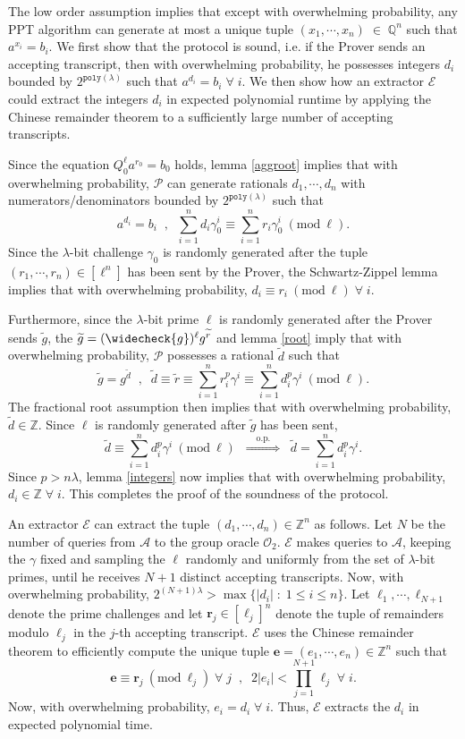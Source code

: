 \documentclass[11pt, lettersize, notitlepage, leqno, footskip=0.6cm]{article}
\newcommand{\bz}{\mathbb Z}
\newcommand{\bq}{\mathbb Q}
\newcommand{\pl}{\prod\limits}
\newcommand{\slim}{\sum\limits}
\newcommand{\ttt}{\texttt}
\newcommand{\impop}{\overset{\;\;\;\;\mr{o.p.}\;\;\;\;}{\Longrightarrow}}
\newcommand{\wti}{\widetilde}
\newcommand{\mc}{\mathcal}
\newcommand{\mbf}{\mathbf}
\newcommand{\mr}{\mathrm}
\newcommand{\lam}{\lambda}
\newcommand{\weck}{\widecheck}
\newcommand{\mP}{\mc{P}}
\newcommand{\A}{\mc{A}}
\newcommand{\vs}{\vspace{-0.15cm}}
\newcommand{\op}{overwhelming probability}
\newcommand{\Mod}[1]{\ (\mathrm{mod}\ #1)}
\newcommand{\E}{\mc{E}}
\numberwithin{equation}{section}
\begin{document}
\begin{prf} The low order assumption implies that except with \op, any PPT algorithm can generate at most a unique tuple $(x_1,\cdots,x_n)\;\in\;\bq^n$ such that $a^{x_i} = b_i$. We first show that the protocol is sound, i.e. if the Prover sends an accepting transcript, then with \op, he possesses integers $d_i$ bounded by $2^{\ttt{poly}(\lam)}$ such that $a^{d_i} = b_i\;\forall\;i$.
We then show how an extractor $\E$ could extract the integers $d_i$ in expected polynomial runtime by applying the Chinese remainder theorem to a sufficiently large number of accepting transcripts. 

Since the equation $Q_0^{\ell}a^{r_0} = b_0$ holds, lemma \ref{aggroot} implies that with \op, 
$\mP$ can generate rationals $d_1,\cdots,d_n$ with numerators/denominators bounded by $2^{\ttt{poly}(\lam)}$ such that \vs $$a^{d_i} = b_i \;\;,\;\;\slim_{i=1}^{n} d_i\gamma_{0}^i \equiv \slim_{i=1}^{n} r_i\gamma_{0}^i\Mod{\ell}.$$ Since the $\lam$-bit challenge $\gamma_{0}$ is randomly generated after the tuple $(r_1,\cdots,r_n)\in[\ell^n]$ has been sent by the Prover, the Schwartz-Zippel lemma implies that with \op, $d_i\equiv r_i\Mod{\ell}\;\forall\;i$. 

Furthermore, since the $\lam$-bit prime $\ell$ is randomly generated after the Prover sends $\wti{g}$, the $\wti{g} = (\weck{g})^{\ell}g^{\wti{r}}$ and lemma \ref{root} imply that with \op, $\mP$ possesses a rational $\wti{d}$ such that \vs $$\wti{g} = g^{\wti{d}}\;\;,\;\;\wti{d}\equiv\wti{r}\equiv \slim_{i=1}^n r_i^p\gamma^i\equiv \slim_{i=1}^n d_i^p\gamma^i\Mod{\ell} .$$ The fractional root assumption then implies that with \op, $\wti{d}\in \bz$. Since $\ell$ is randomly generated after $\wti{g}$ has been sent, \vs $$\wti{d}\equiv \slim_{i=1}^n d_i^p\gamma^i\Mod{\ell}\;\;\impop\;\;\wti{d} = \slim_{i=1}^n d_i^p\gamma^i.$$ Since $p> n\lam$, lemma \ref{integers} now implies that with \op, $d_i\in\bz\;\forall\;i$. This completes the proof of the soundness of the protocol.

An extractor $\E$ can extract the tuple $(d_1,\cdots,d_n)\in\bz^n$ as follows. Let $N$ be the number of queries from $\A$ to the group oracle $\mc{O}_2$. $\E$ makes queries to $\A$, keeping the $\gamma$ fixed and sampling the $\ell$ randomly and uniformly from the set of $\lam$-bit primes, until he receives $N+1$ distinct accepting transcripts. Now, with \op, $2^{(N+1)\lam} > \max\{|d_i|\;:\;1\leq i\leq n \}$. Let $\ell_1,\cdots,\ell_{N+1}$ denote the prime challenges and let $\mbf{r}_j\in [\ell_j]^n$ denote the tuple of remainders modulo $\ell_j$ in the $j$-th accepting transcript. $\E$ uses the Chinese remainder theorem to efficiently compute the unique tuple $\mbf{e} = (e_1,\cdots,e_n)\in \bz^n$ such that \vspace{-0.3cm} $$\mbf{e}\equiv \mbf{r}_j\Mod{\ell_j}\;\forall\; j\;\;,\;\;2|e_i|< \pl_{j=1}^{N+1} \ell_j\;\forall\; i.$$ Now, with \op, $e_i = d_i\;\forall\;i.$ Thus, $\E$ extracts the $d_i$ in expected polynomial time. \end{prf}
\end{document}
